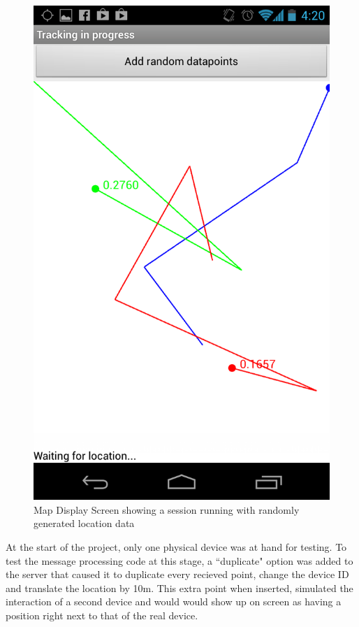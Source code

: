 \begin{figure}[h]
\centering
\includegraphics[scale=0.15]{generatedPoints}
\caption{Map Display Screen showing a session running with randomly generated location data}
\label{generatedPoints}
\end{figure}

At the start of the project, only one physical device was at hand for testing. To test the message processing code at this stage, a ``duplicate" option was added to the server that caused it to duplicate every recieved point, change the device ID and translate the location by 10m. This extra point when inserted, simulated the interaction of a second device and would would show up on screen as having a position right next to that of the real device.

